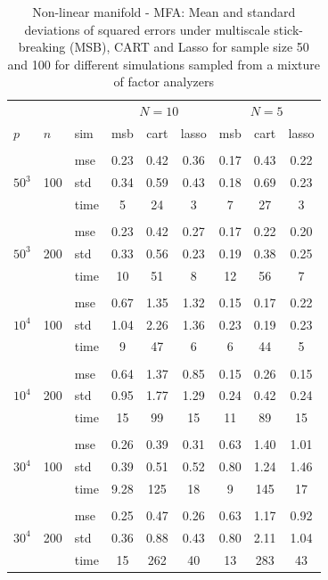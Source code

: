 \documentclass{article} %
\begin{document}
\begin{table}[t]
\caption{Non-linear manifold - MFA: Mean and standard deviations of squared errors under multiscale stick-breaking (MSB), CART and Lasso for sample size 50 and 100 for different simulations sampled from a mixture of factor analyzers}\label{table:mfa}
\vskip 0.15in
\begin{center}
\begin{small}
\begin{sc}
\begin{tabular}{lllcccccc}
\hline
&&&\multicolumn{3}{c}{$N=10$}&\multicolumn{3}{c}{$N=5$}\\
$p$&$n$& sim& msb&cart&lasso & msb&cart&lasso\\
\\
\multirow{3}{*}{$50^3$}&\multirow{3}{*}{100}&mse&0.23&0.42&0.36&0.17&0.43&0.22\\
&&std & 0.34 &0.59&0.43&0.18&0.69&0.23\\
&&time &5&24 & 3&7&27&3\\

\\
\multirow{3}{*}{$50^3$}&\multirow{3}{*}{200}&mse&0.23 &0.42 &0.27&0.17&0.22&0.20\\
&&std & 0.33& 0.56&0.23&0.19&0.38&0.25\\
&&time & 10 &51&8&12&56&7\\

\\
\multirow{3}{*}{$10^4$}&\multirow{3}{*}{100}&mse&0.67&1.35&1.32&0.15&0.17&0.22\\
&&std & 1.04&2.26&1.36&0.23&0.19&0.23\\
&&time &9&47&6&6&44&5\\

\\
\multirow{3}{*}{$10^4$}&\multirow{3}{*}{200}&mse&0.64&1.37&0.85&0.15&0.26&0.15\\
&&std &0.95 &1.77&1.29&0.24&0.42&0.24\\
&&time &15&99&15&11&89&15\\
\\
\multirow{3}{*}{$30^4$}&\multirow{3}{*}{100}&mse& 0.26&0.39&0.31&0.63&1.40&1.01\\
&&std &0.39&0.51&0.52&0.80 &1.24& 1.46 \\
&&time &9.28&125&18&9 &145& 17\\
\\
\multirow{3}{*}{$30^4$}&\multirow{3}{*}{200}&mse&0.25&0.47&0.26&0.63&1.17&0.92\\
&&std &0.36&0.88&0.43 & 0.80&2.11&1.04 \\
&&time &15&262&40&13&283&43\\



\end{tabular}
\end{sc}
\end{small}
\end{center}
\end{table}
\end{document}
